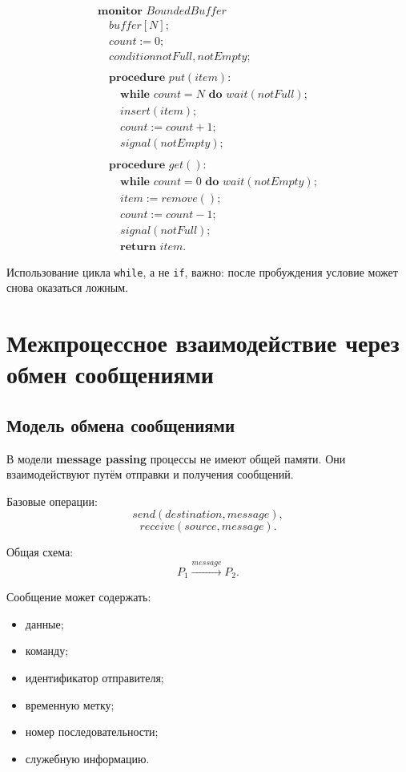 \documentclass[12pt,a4paper]{article}
\begin{document}
\[
\begin{array}{l}
\textbf{monitor } BoundedBuffer\\
\quad buffer[N];\\
\quad count := 0;\\
\quad condition notFull, notEmpty;\\
\\
\quad \textbf{procedure } put(item):\\
\quad\quad \textbf{while } count = N \textbf{ do } wait(notFull);\\
\quad\quad insert(item);\\
\quad\quad count := count + 1;\\
\quad\quad signal(notEmpty);\\
\\
\quad \textbf{procedure } get():\\
\quad\quad \textbf{while } count = 0 \textbf{ do } wait(notEmpty);\\
\quad\quad item := remove();\\
\quad\quad count := count - 1;\\
\quad\quad signal(notFull);\\
\quad\quad \textbf{return } item.
\end{array}
\]

Использование цикла \texttt{while}, а не \texttt{if}, важно: после пробуждения условие может снова оказаться ложным.

\section{Межпроцессное взаимодействие через обмен сообщениями}

\subsection{Модель обмена сообщениями}

В модели \textbf{message passing} процессы не имеют общей памяти. Они взаимодействуют путём отправки и получения сообщений.

Базовые операции:
\[
send(destination, message),
\]
\[
receive(source, message).
\]

Общая схема:
\[
P_1 \xrightarrow{message} P_2.
\]

Сообщение может содержать:
\begin{itemize}
    \item данные;
    \item команду;
    \item идентификатор отправителя;
    \item временную метку;
    \item номер последовательности;
    \item служебную информацию.
\end{itemize}
\end{document}
